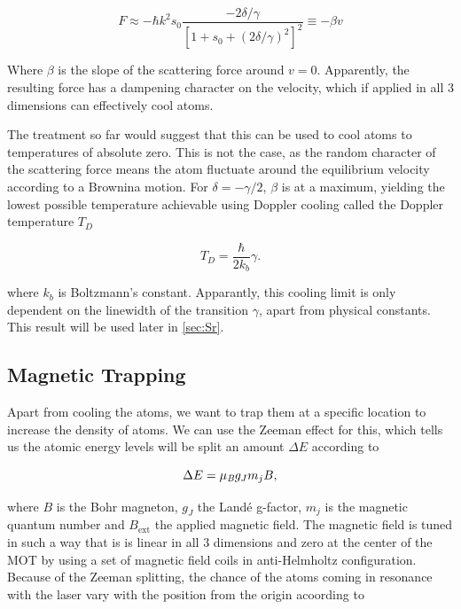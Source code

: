 \begin{equation}\label{eq:linearize}
	F \approx - \hbar k^2 s_0 \frac{-2\delta/\gamma}{\left[1+s_0+(2\delta/\gamma)^2\right]^2} \equiv -\beta v
\end{equation}

Where $\beta$ is the slope of the scattering force around $v=0$. Apparently, the resulting force has a dampening character on the velocity, which if applied in all 3 dimensions can effectively cool atoms. 

The treatment so far would suggest that this can be used to cool atoms to temperatures of absolute zero. This is not the case, as the random character of the scattering force means the atom fluctuate around the equilibrium velocity according to a Brownina motion. For $\delta=-\gamma/2$, $\beta$ is at a maximum, yielding the lowest possible temperature achievable using Doppler cooling called the Doppler temperature $T_D$

\begin{equation}\label{eq:DopplerTemperature}
	T_D = \frac{\hbar}{2k_b} \gamma.
\end{equation}

where $k_b$ is Boltzmann's constant. Apparantly, this cooling limit is only dependent on the linewidth of the transition $\gamma$, apart from physical constants. This result will be used later in \cref{sec:Sr}.

\subsection{Magnetic Trapping}

Apart from cooling the atoms, we want to trap them at a specific location to increase the density of atoms. We can use the Zeeman effect for this, which tells us the atomic energy levels will be split an amount $\Delta E$ according to \cite{Griffiths2004}

\begin{equation}\label{eq:Zeeman}
	\Delta E = \mu_{\emph{B}} g_J m_j B,
\end{equation}

where $B$ is the Bohr magneton, $g_J$ the Landé g-factor, $m_j$ is the magnetic quantum number and $B_{\text{ext}}$ the applied magnetic field. The magnetic field is tuned in such a way that is is linear in all 3 dimensions and zero at the center of the MOT by using a set of magnetic field coils in anti-Helmholtz configuration. Because of the Zeeman splitting, the chance of the atoms coming in resonance with the laser vary with the position from the origin acoording to 

